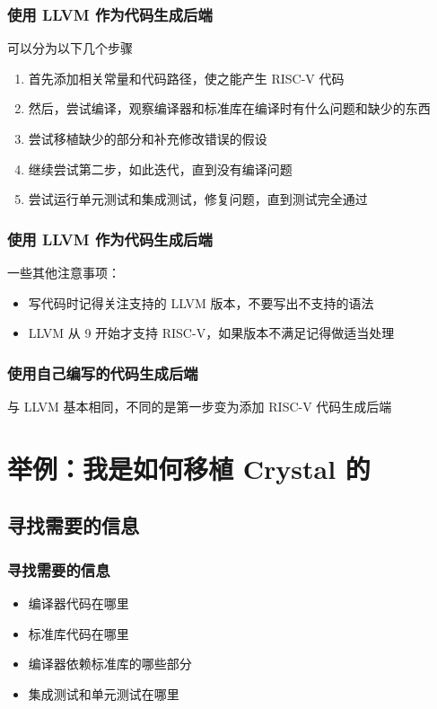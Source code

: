 \documentclass[UTF-8]{ctexbeamer}
\begin{document}
\begin{frame}
	\frametitle{使用 LLVM 作为代码生成后端}

	可以分为以下几个步骤

	\begin{enumerate}
		\item 首先添加相关常量和代码路径，使之能产生 RISC-V 代码
		\item 然后，尝试编译，观察编译器和标准库在编译时有什么问题和缺少的东西
		\item 尝试移植缺少的部分和补充修改错误的假设
		\item 继续尝试第二步，如此迭代，直到没有编译问题
		\item 尝试运行单元测试和集成测试，修复问题，直到测试完全通过
	\end{enumerate}

\end{frame}

\begin{frame}
	\frametitle{使用 LLVM 作为代码生成后端}

	一些其他注意事项：

	\begin{itemize}
		\item 写代码时记得关注支持的 LLVM 版本，不要写出不支持的语法
		\item LLVM 从 9 开始才支持 RISC-V，如果版本不满足记得做适当处理
	\end{itemize}

\end{frame}

\begin{frame}
	\frametitle{使用自己编写的代码生成后端}

	与 LLVM 基本相同，不同的是第一步变为添加 RISC-V 代码生成后端

\end{frame}

\section{举例：我是如何移植 Crystal 的}

\subsection{寻找需要的信息}
\begin{frame}
	\frametitle{寻找需要的信息}

	\begin{itemize}
		\item 编译器代码在哪里
		\item 标准库代码在哪里
		\item 编译器依赖标准库的哪些部分
		\item 集成测试和单元测试在哪里
	\end{itemize}

\end{frame}
\end{document}

